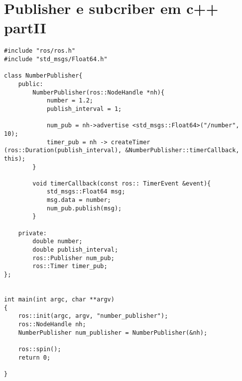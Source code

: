 \documentclass[letterpaper]{article}
\begin{document}
\begin{itemize}
        
    \end{itemize}
    
    
\section{Publisher e subcriber em c++ partII}
\begin{lstlisting}[style=cppStyle, title=$number\_publish.cpp$] 
#include "ros/ros.h"
#include "std_msgs/Float64.h"

class NumberPublisher{
    public:
        NumberPublisher(ros::NodeHandle *nh){
            number = 1.2;
            publish_interval = 1;

            num_pub = nh->advertise <std_msgs::Float64>("/number", 10);
            timer_pub = nh -> createTimer (ros::Duration(publish_interval), &NumberPublisher::timerCallback, this);
        }

        void timerCallback(const ros:: TimerEvent &event){
            std_msgs::Float64 msg;
            msg.data = number;
            num_pub.publish(msg);
        }

    private:
        double number;
        double publish_interval;
        ros::Publisher num_pub;
        ros::Timer timer_pub;
};


int main(int argc, char **argv)
{
    ros::init(argc, argv, "number_publisher");
    ros::NodeHandle nh;
    NumberPublisher num_publisher = NumberPublisher(&nh);

    ros::spin();
    return 0;

}

\end{lstlisting}

\end{document}
